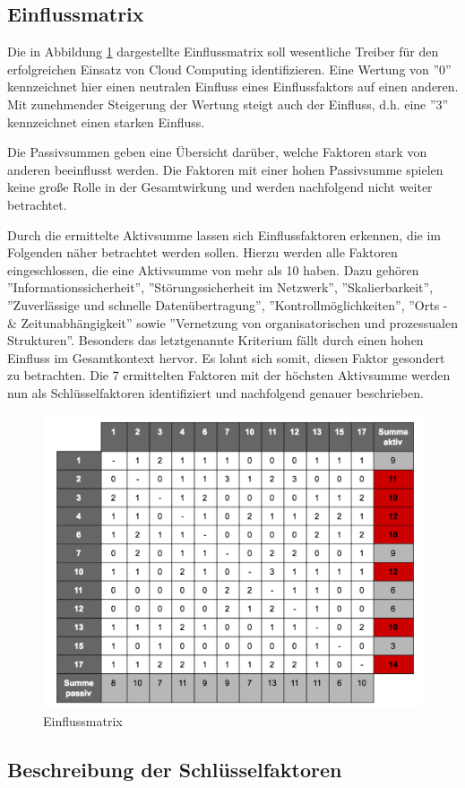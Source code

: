 \subsection{Einflussmatrix}

Die in Abbildung \ref{fig:matrix} dargestellte Einflussmatrix soll wesentliche Treiber für den erfolgreichen Einsatz von Cloud Computing identifizieren. Eine Wertung von ''0'' kennzeichnet hier einen neutralen Einfluss eines Einflussfaktors auf einen anderen. Mit zunehmender Steigerung der Wertung steigt auch der Einfluss, d.h. eine ''3'' kennzeichnet einen starken Einfluss. 

Die Passivsummen geben eine Übersicht darüber, welche Faktoren stark von anderen beeinflusst werden. Die Faktoren mit einer hohen Passivsumme spielen keine große Rolle in der Gesamtwirkung und werden nachfolgend nicht weiter betrachtet.

Durch die ermittelte Aktivsumme lassen sich Einflussfaktoren erkennen, die im Folgenden näher betrachtet werden sollen. Hierzu werden alle Faktoren eingeschlossen, die eine Aktivsumme von mehr als 10 haben. Dazu gehören ''Informationssicherheit'', ''Störungssicherheit im Netzwerk'', ''Skalierbarkeit'', ''Zuverlässige und schnelle Datenübertragung'', ''Kontrollmöglichkeiten'', ''Orts - \& Zeitunabhängigkeit'' sowie ''Vernetzung von organisatorischen und prozessualen Strukturen''. Besonders das letztgenannte Kriterium fällt durch einen hohen Einfluss im Gesamtkontext hervor. Es lohnt sich somit, diesen Faktor gesondert zu betrachten. Die 7 ermittelten Faktoren mit der höchsten Aktivsumme werden nun als Schlüsselfaktoren identifiziert und nachfolgend genauer beschrieben.

\begin{figure}
	\centering
	\includegraphics[width=\linewidth]{images/matrix}
	\caption[Caption for parameters]{Einflussmatrix}
	\label{fig:matrix}
\end{figure}

\subsection{Beschreibung der Schlüsselfaktoren}